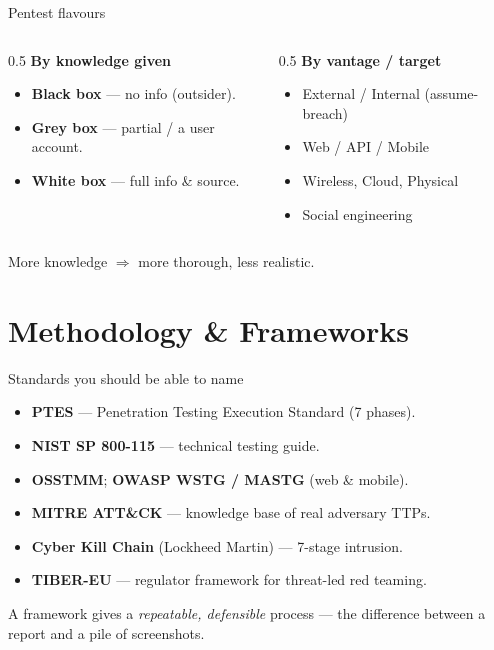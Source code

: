 \documentclass[aspectratio=169,11pt]{beamer}
\begin{document}
\begin{frame}{Pentest flavours}
  \begin{columns}[T]
    \begin{column}{0.5\textwidth}
      \textbf{By knowledge given}
      \begin{itemize}
        \item \textbf{Black box} --- no info (outsider).
        \item \textbf{Grey box} --- partial / a user account.
        \item \textbf{White box} --- full info \& source.
      \end{itemize}
    \end{column}
    \begin{column}{0.5\textwidth}
      \textbf{By vantage / target}
      \begin{itemize}\footnotesize
        \item External / Internal (assume-breach)
        \item Web / API / Mobile
        \item Wireless, Cloud, Physical
        \item Social engineering
      \end{itemize}
    \end{column}
  \end{columns}
  \vspace{0.5em}
  More knowledge $\Rightarrow$ more thorough, less realistic.
\end{frame}

\section{Methodology \& Frameworks}
\begin{frame}{Standards you should be able to name}
  \begin{itemize}
    \item \textbf{PTES} --- Penetration Testing Execution Standard (7 phases).
    \item \textbf{NIST SP 800-115} --- technical testing guide.
    \item \textbf{OSSTMM}; \textbf{OWASP WSTG / MASTG} (web \& mobile).
    \item \textbf{MITRE ATT\&CK} --- knowledge base of real adversary TTPs.
    \item \textbf{Cyber Kill Chain} (Lockheed Martin) --- 7-stage intrusion.
    \item \textbf{TIBER-EU} --- regulator framework for threat-led red teaming.
  \end{itemize}
  \footnotesize A framework gives a \emph{repeatable, defensible} process ---
  the difference between a report and a pile of screenshots.
\end{frame}
\end{document}
